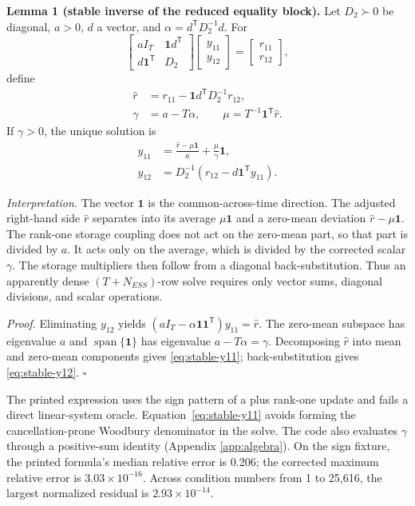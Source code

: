 \documentclass[10pt,journal]{IEEEtran}
\begin{document}
\textbf{Lemma 1 (stable inverse of the reduced equality block).}
Let $D_2\succ0$ be diagonal, $a>0$, $d$ a vector, and
$\alpha=d^{\mathsf T}D_2^{-1}d$. For
\begin{equation}
\begin{bmatrix}
aI_T & \bm{1}d^{\mathsf T}\\
d\bm{1}^{\mathsf T} & D_2
\end{bmatrix}
\begin{bmatrix}y_{11}\\y_{12}\end{bmatrix}
=
\begin{bmatrix}r_{11}\\r_{12}\end{bmatrix},
\end{equation}
define
\begin{align}
\widehat r&=r_{11}-\bm{1}d^{\mathsf T}D_2^{-1}r_{12},\\
\gamma&=a-T\alpha,\qquad
\mu=T^{-1}\bm{1}^{\mathsf T}\widehat r.
\end{align}
If $\gamma>0$, the unique solution is
\begin{align}
y_{11}&=\frac{\widehat r-\mu\bm{1}}{a}
       +\frac{\mu}{\gamma}\bm{1},
\label{eq:stable-y11}\\
y_{12}&=D_2^{-1}\!\left(r_{12}-d\bm{1}^{\mathsf T}y_{11}\right).
\label{eq:stable-y12}
\end{align}

\emph{Interpretation.} The vector $\bm{1}$ is the common-across-time direction.
The adjusted right-hand side $\widehat r$ separates into its average
$\mu\bm{1}$ and a zero-mean deviation $\widehat r-\mu\bm{1}$. The rank-one
storage coupling does not act on the zero-mean part, so that part is divided by
$a$. It acts only on the average, which is divided by the corrected scalar
$\gamma$. The storage multipliers then follow from a diagonal back-substitution.
Thus an apparently dense $(T+N_{ESS})$-row solve requires only vector sums,
diagonal divisions, and scalar operations.

\emph{Proof.} Eliminating $y_{12}$ yields
$(aI_T-\alpha\bm{1}\bm{1}^{\mathsf T})y_{11}=\widehat r$.
The zero-mean subspace has eigenvalue $a$ and
$\operatorname{span}\{\bm{1}\}$ has eigenvalue
$a-T\alpha=\gamma$. Decomposing $\widehat r$ into mean and zero-mean
components gives \eqref{eq:stable-y11}; back-substitution gives
\eqref{eq:stable-y12}. \hfill$\square$

The printed expression uses the sign pattern of a plus rank-one update and
fails a direct linear-system oracle. Equation~\eqref{eq:stable-y11} avoids
forming the cancellation-prone Woodbury denominator in the solve. The code
also evaluates $\gamma$ through a positive-sum identity (Appendix
\ref{app:algebra}). On the sign fixture, the printed formula's median relative
error is 0.206; the corrected maximum relative error is
$3.03\times10^{-16}$. Across condition numbers from 1 to 25,616, the largest
normalized residual is $2.93\times10^{-14}$.
\end{document}
